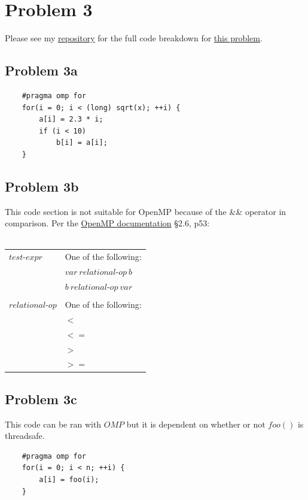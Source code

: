 \documentclass{article}
\begin{document}
\newpage
\section{Problem 3}
Please see my \href{https://github.com/macattackftw/HighPerfComputing}{repository} for the full code breakdown for \href{https://github.com/macattackftw/HighPerfComputing/blob/master/HW1/problem3.cpp}{this problem}.
\subsection{Problem 3a}
\begin{verbatim}
    #pragma omp for
    for(i = 0; i < (long) sqrt(x); ++i) {
        a[i] = 2.3 * i;
        if (i < 10) 
            b[i] = a[i];
    }
\end{verbatim}

\subsection{Problem 3b}
This code section is not suitable for OpenMP because of the \&\& operator in comparison.
Per the \hyperlink{https://www.openmp.org/wp-content/uploads/openmp-4.5.pdf}{OpenMP documentation} \S2.6, p53:\\\\
\begin{tabular}{@{}ll}
$test$-$expr$ & One of the following:\\
& $var\ relational$-$op\ b$\\
& $b\ relational$-$op\ var$\\\\

$relational$-$op$ & One of the following:\\
& $<$  \\
& $<=$ \\
& $>$  \\
& $>=$ \\
\end{tabular}

\subsection{Problem 3c}
This code can be ran with $OMP$ but it is dependent on whether or not $foo()$ is threadsafe.
\begin{verbatim}
    #pragma omp for
    for(i = 0; i < n; ++i) {
        a[i] = foo(i);
    }
\end{verbatim}
\end{document}
